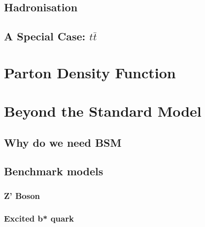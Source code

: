 \subsection{Hadronisation}
\subsection{A Special Case: $t\bar{t}$}

\section{Parton Density Function}
\label{theo-pdf}

\section{Beyond the Standard Model}
\label{theo-bsm}

\subsection{Why do we need BSM}
\subsection{Benchmark models}
\subsubsection{Z' Boson}
\subsubsection{Excited b* quark}
